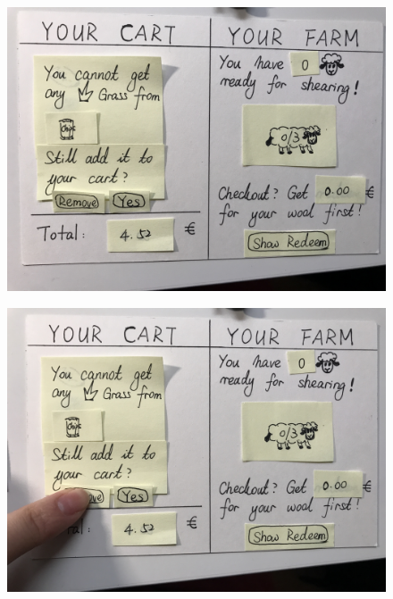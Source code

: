 \documentclass[a4paper,10pt,oneside]{scrreprt}
\begin{document}
\begin{figure}[h]
	\centering
	\includegraphics[scale=0.10, clip, trim={0em 0em 0em 0em}]{images/IMG_0570.jpg}
\end{figure}

\begin{figure}[h]
	\centering
	\includegraphics[scale=0.10, clip, trim={0em 0em 0em 0em}]{images/IMG_0571.jpg}
\end{figure}
\end{document}
